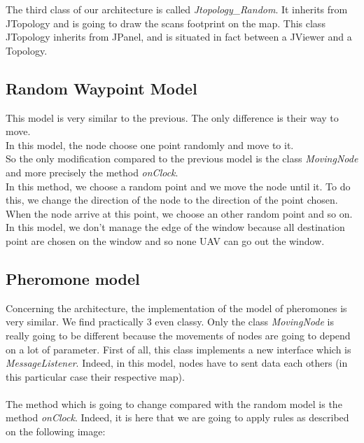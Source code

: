 The third class of our architecture is called \textit{Jtopology\_Random}. It inherits from JTopology and is going to draw the scans footprint on the map. This class JTopology inherits from JPanel, and is situated in fact between a JViewer and a Topology.

\subsection{Random Waypoint Model}

This model is very similar to the previous. The only difference is their way to move.\\
In this model, the node choose one point randomly and move to it.\\
So the only modification compared to the previous model is the class \textit{MovingNode} and more precisely the method \textit{onClock}.\\
In this method, we choose a random point and we move the node until it. To do this, we change the direction of the node to the direction of the point chosen. When the node arrive at this point, we choose an other random point and so on.\\
In this model, we don't manage the edge of the window because all destination point are chosen on the window and so none UAV can go out the window.


\subsection{Pheromone model}

Concerning the architecture, the implementation of the model of pheromones is very similar. We find practically 3 even classy. Only the class \textit{MovingNode} is really going to be different because the movements of nodes are going to depend on a lot of parameter. First of all, this class implements a new interface which is \textit{MessageListener}. Indeed, in this model, nodes have to sent data each others (in this particular case their respective map).\\\\

The method which is going to change compared with the random model is the method \textit{onClock}. Indeed, it is here that we are going to apply rules as described on the following image:


